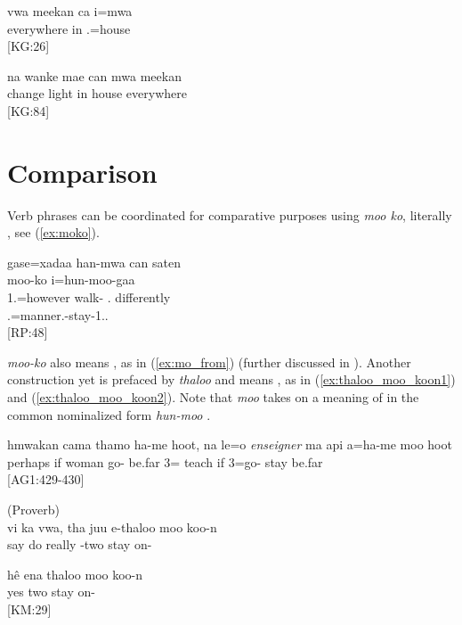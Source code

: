  \ea
 \label{ex:everywhere}
 \gll vwa meekan ca i=mwa\\ 
   everywhere in .=house\\ 
 \glt {} {[KG:26]}
 \z
 
 
 \ea \label{ex:meekan_adv}
 \gll na wanke mae can mwa meekan\\ 
   change light in house everywhere\\ 
 \glt {} {[KG:84]}
  \z
 
\section{Comparison}
\label{sec:Comp}
Verb phrases can be coordinated for comparative purposes using \textit{moo ko}, literally , see (\ref{ex:moko}). 

\ea \label{ex:moko}
\gll gase=xadaa han-mwa can saten\\ moo-ko i=hun-moo-gaa\\ 
 1.=however walk- . differently \\  .=manner.-stay-1..\\ 
\glt {} {[RP:48]}
\z 

\textit{moo-ko} also means , as in (\ref{ex:mo_from}) (further discussed in ). Another construction yet is prefaced by \textit{thaloo}  and means , as in (\ref{ex:thaloo_moo_koon1}) and (\ref{ex:thaloo_moo_koon2}). Note that \textit{moo}  takes on a meaning of  in the common nominalized form \textit{hun-moo}  .

\ea\label{ex:mo_from}
\gll hmwakan cama thamo ha-me hoot, na le=o \textit{enseigner} ma api a=ha-me moo hoot\\ 
 perhaps if woman go- be.far  3= teach if  3=go- stay be.far\\ 
\glt {} {[AG1:429-430]}
\z


\ea\label{ex:thaloo_moo_koon1}
(Proverb)\\
\gll vi ka vwa, tha juu e-thaloo moo koo-n\\ 
 say  do  really -two stay on-\\ 
\glt {}
\z

\ea\label{ex:thaloo_moo_koon2}
\gll hê ena thaloo moo koo-n\\ 
 yes  two stay on-\\ 
\glt {} {[KM:29]}
\z
